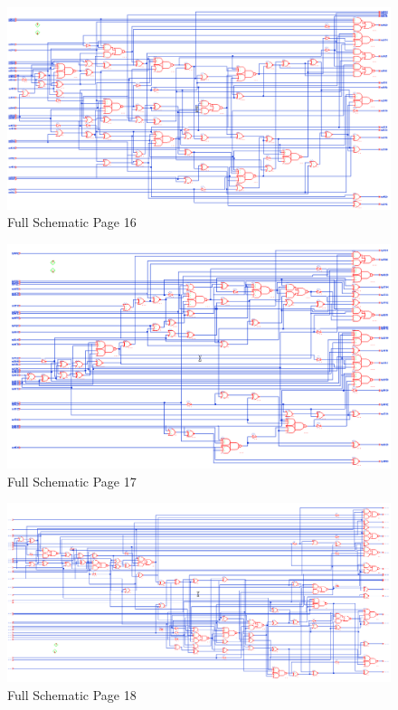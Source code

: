 \documentclass[11pt]{article}
\begin{document}
		
		\begin{figure}[H] 
			\centering 
			\includegraphics[width=\textwidth,height=\dimexpr\textheight-4\baselineskip-\abovecaptionskip-\belowcaptionskip\relax,keepaspectratio]{"Pictures/Full Schematic Page 16"}
			\caption{Full Schematic Page 16} 
			\label{fig:Full-Schematic-Page-16} 
		\end{figure}
		
		
		\begin{figure}[H] 
			\centering 
			\includegraphics[width=\textwidth,height=\dimexpr\textheight-4\baselineskip-\abovecaptionskip-\belowcaptionskip\relax,keepaspectratio]{"Pictures/Full Schematic Page 17"}
			\caption{Full Schematic Page 17} 
			\label{fig:Full-Schematic-Page-17} 
		\end{figure}
		
		
		\begin{figure}[H] 
			\centering 
			\includegraphics[width=\textwidth,height=\dimexpr\textheight-4\baselineskip-\abovecaptionskip-\belowcaptionskip\relax,keepaspectratio]{"Pictures/Full Schematic Page 18"}
			\caption{Full Schematic Page 18} 
			\label{fig:Full-Schematic-Page-18} 
		\end{figure}
		
\end{document}

